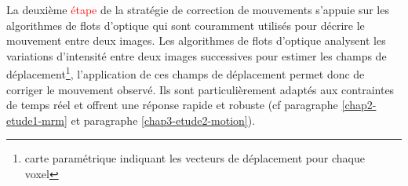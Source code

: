 La deuxième \textcolor{red}{étape} de la stratégie de correction de mouvements s’appuie sur les algorithmes de flots d’optique qui sont couramment utilisés pour décrire le mouvement entre deux images. Les algorithmes de flots d’optique analysent les variations d’intensité entre deux images successives pour estimer les champs de déplacement\footnote{carte paramétrique indiquant les vecteurs de déplacement pour chaque voxel}, l’application de ces champs de déplacement permet donc de corriger le mouvement observé. Ils sont particulièrement adaptés aux contraintes de temps réel et offrent une réponse rapide et robuste (cf paragraphe \ref{chap2-etude1-mrm} et paragraphe \ref{chap3-etude2-motion}).\\